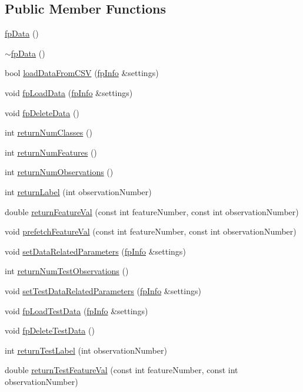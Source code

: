 \subsection*{Public Member Functions}
\begin{DoxyCompactItemize}
\item 
\hyperlink{classfp_1_1fpData_a0e111a379a969d2ff0b3e8c5911cf78a}{fp\+Data} ()
\item 
\hyperlink{classfp_1_1fpData_a62998c12f30ea88e6b3ea30b17d1a3e0}{$\sim$fp\+Data} ()
\item 
bool \hyperlink{classfp_1_1fpData_a2b4d9be328aaa7acf9a2561150da0402}{load\+Data\+From\+C\+SV} (\hyperlink{classfp_1_1fpInfo}{fp\+Info} \&settings)
\item 
void \hyperlink{classfp_1_1fpData_a91c727b1475eca340ca14c241b25c959}{fp\+Load\+Data} (\hyperlink{classfp_1_1fpInfo}{fp\+Info} \&settings)
\item 
void \hyperlink{classfp_1_1fpData_a44df119acad6c339966d67f2c634a369}{fp\+Delete\+Data} ()
\item 
int \hyperlink{classfp_1_1fpData_a7abfc93af30b7262d59b6d304796a09d}{return\+Num\+Classes} ()
\item 
int \hyperlink{classfp_1_1fpData_a95088e33b280e5c82b3543033d8852e1}{return\+Num\+Features} ()
\item 
int \hyperlink{classfp_1_1fpData_a9056a8c0e7e48fe9aa591269064ecc43}{return\+Num\+Observations} ()
\item 
int \hyperlink{classfp_1_1fpData_aac722f51424cb7f6ab7d89525f82cc72}{return\+Label} (int observation\+Number)
\item 
double \hyperlink{classfp_1_1fpData_a6b359086ec1e5c534095600e2ed5575f}{return\+Feature\+Val} (const int feature\+Number, const int observation\+Number)
\item 
void \hyperlink{classfp_1_1fpData_a3f9645ca93e9b64a788b3042e9e41fcc}{prefetch\+Feature\+Val} (const int feature\+Number, const int observation\+Number)
\item 
void \hyperlink{classfp_1_1fpData_ab48923d57206e17b88f0d89833051b43}{set\+Data\+Related\+Parameters} (\hyperlink{classfp_1_1fpInfo}{fp\+Info} \&settings)
\item 
int \hyperlink{classfp_1_1fpData_a9a115d29fafb6e5b941f4e0c860e65e7}{return\+Num\+Test\+Observations} ()
\item 
void \hyperlink{classfp_1_1fpData_ab60d2098334e253a0bf3115f029c1996}{set\+Test\+Data\+Related\+Parameters} (\hyperlink{classfp_1_1fpInfo}{fp\+Info} \&settings)
\item 
void \hyperlink{classfp_1_1fpData_a4b527bc84762c4708992b7fdce3d0602}{fp\+Load\+Test\+Data} (\hyperlink{classfp_1_1fpInfo}{fp\+Info} \&settings)
\item 
void \hyperlink{classfp_1_1fpData_a996eedfc5ffe559ce1f6061af1efc1db}{fp\+Delete\+Test\+Data} ()
\item 
int \hyperlink{classfp_1_1fpData_a50b6343c52560d1992de50e8cd6b1206}{return\+Test\+Label} (int observation\+Number)
\item 
double \hyperlink{classfp_1_1fpData_a42f76961f1649e329d654e9e1bb13fc6}{return\+Test\+Feature\+Val} (const int feature\+Number, const int observation\+Number)
\end{DoxyCompactItemize}
